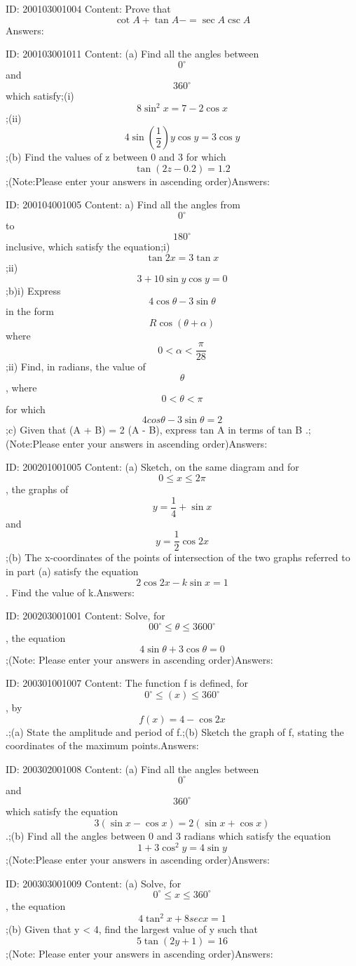 \documentclass{article}
\begin{document}
ID: 200103001004
Content:
Prove that  \[\cot A+ \tan A-=\sec A\csc A\]Answers:

ID: 200103001011
Content:
(a) Find all the angles between  \[0^{\circ}\] and \[360^{\circ}\]  which satisfy;(i) \[8\sin^2x=7-2\cos x\];(ii) \[4\sin(\frac{1}{2})y \cos y=3\cos y\];(b)	Find the values of z between 0 and 3 for which \[\tan(2z - 0.2) = 1.2\];(Note:Please enter your answers in ascending order)Answers:

ID: 200104001005
Content:
a) Find all the angles from $$0 ^{\circ}$$ to $$180 ^{\circ}$$ inclusive, which satisfy the equation;i) $$\tan 2x=3\tan x$$;ii) $$3+10\sin y\cos y=0$$;b)i) Express $$4\cos\theta-3\sin\theta$$ in the form $$R\cos(\theta+\alpha)$$ where $$0<\alpha<\frac{\pi}{28} $$;ii) Find, in radians, the value of $$\theta$$, where $$0<\theta<\pi$$ for which $$4cos\theta-3\sin\theta=2$$;c) Given that \sin(A + B) = 2 \sin(A - B), express tan A in terms of tan B .;(Note:Please enter your answers in ascending order)Answers:

ID: 200201001005
Content:
(a)	Sketch, on the same diagram and for $$0 \leq x \leq 2\pi$$, the graphs of $$y= \frac{1}{4}+\sin x$$ and $$y= \frac{1}{2}\cos 2x$$;(b)	The x-coordinates of the points of intersection of the two graphs referred to in part (a) satisfy the equation $$2 \cos  2x-k \sin  x = 1$$. Find the value of k.Answers:

ID: 200203001001
Content:
Solve, for $$0 0^{\circ}\leq\theta\leq360 0^{\circ}$$, the equation $$4\sin \theta+3\cos \theta=0$$;(Note: Please enter your answers in ascending order)Answers:

ID: 200301001007
Content:
The function f is defined, for $$0^{\circ}\leq(x)\leq360^{\circ}$$, by $$f(x) = 4 - \cos 2x$$.;(a)	State the amplitude and period of f.;(b)	Sketch the graph of f, stating the coordinates of the maximum points.Answers:

ID: 200302001008
Content:
(a)	Find all the angles between $$0^{\circ}$$ and $$360^{\circ}$$ which satisfy the equation $$3(\sin  x-\cos  x) = 2(\sin  x + \cos  x)$$.;(b)	Find all the angles between 0 and 3 radians which satisfy the equation $$1+3\cos ^2y=4\sin y$$;(Note:Please enter your answers in ascending order)Answers:

ID: 200303001009
Content:
(a)	Solve, for $$0^{\circ}\leq x\leq 360^{\circ}$$, the equation $$4\tan ^2x+8secx=1$$;(b) Given that y < 4, find the largest value of y such that $$5 \tan (2y + 1) = 16$$;(Note: Please enter your answers in ascending order)Answers:
\end{document}
